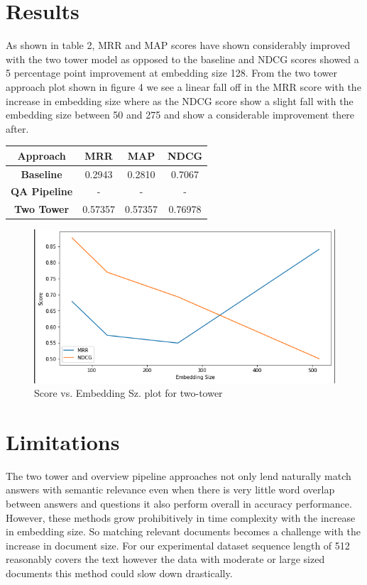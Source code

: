 \documentclass[11pt,a4paper]{article}
\begin{document}
\section{Results}
As shown in table 2, MRR and MAP scores have shown considerably improved with the two tower model as opposed to the baseline and NDCG scores showed a 5 percentage point improvement at embedding size 128. From the two tower approach plot shown in figure 4 we see a linear fall off in the MRR score with the increase in embedding size where as the NDCG score show a slight fall with the embedding size between 50 and 275 and show a considerable improvement there after. 


\begin{center}
\begin{tabular}{||c c c c||} 
 \hline
 \textbf{Approach} & \textbf{MRR} & \textbf{MAP} & \textbf{NDCG} \\ [0.5ex] 
 \hline\hline
 \textbf{Baseline} & 0.2943 & 0.2810 & 0.7067 \\ 
 \hline
 \textbf{QA Pipeline} & - & - & - \\
 \hline
 \textbf{Two Tower} & 0.57357 & 0.57357 & 0.76978 \\
 \hline

 \hline
\end{tabular}
\end{center}

\begin{figure}
  \includegraphics[width=\linewidth]{metric_plot.png}
  \caption{Score vs. Embedding Sz. plot for two-tower}
  \label{fig:two-tower model}
\end{figure}


\section{Limitations}
The two tower and overview pipeline approaches not only lend naturally match answers with semantic relevance even when there is very little word overlap between answers and questions it also perform overall in accuracy performance. However, these methods grow prohibitively in time complexity with the increase in embedding size. So matching relevant documents becomes a challenge with the increase in document size. For our experimental dataset sequence length of 512 reasonably covers the text however the data with moderate or large sized documents this method could slow down drastically. 
\end{document}
